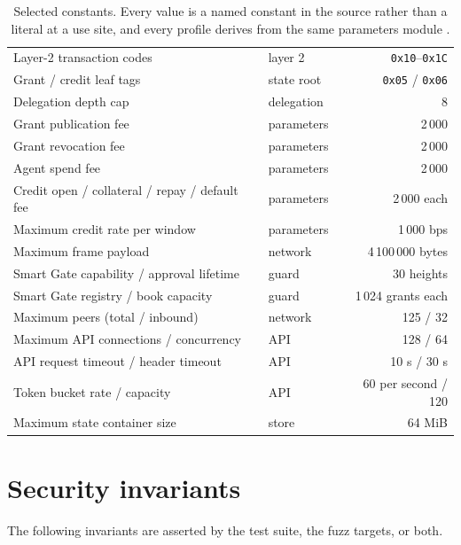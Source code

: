 \documentclass{article}
\begin{document}
\begin{table}[htbp]
\begin{tabular}{llr}
Layer-2 transaction codes & layer 2 & \texttt{0x10}--\texttt{0x1C} \\
Grant / credit leaf tags & state root & \texttt{0x05} / \texttt{0x06} \\
Delegation depth cap & delegation & 8 \\
Grant publication fee & parameters & 2\,000 \\
Grant revocation fee & parameters & 2\,000 \\
Agent spend fee & parameters & 2\,000 \\
Credit open / collateral / repay / default fee & parameters & 2\,000 each \\
Maximum credit rate per window & parameters & 1\,000 bps \\
Maximum frame payload & network & 4\,100\,000 bytes \\
Smart Gate capability / approval lifetime & guard & 30 heights \\
Smart Gate registry / book capacity & guard & 1\,024 grants each \\
Maximum peers (total / inbound) & network & 125 / 32 \\
Maximum API connections / concurrency & API & 128 / 64 \\
API request timeout / header timeout & API & 10 s / 30 s \\
Token bucket rate / capacity & API & 60 per second / 120 \\
Maximum state container size & store & 64 MiB \\
\bottomrule
\end{tabular}
\caption{Selected constants. Every value is a named constant in the source
rather than a literal at a use site, and every profile derives from the same
parameters module \cite{srct-spec}.}
\label{tab:constants}
\end{table}

\section{Security invariants}
\label{app:invariants}

The following invariants are asserted by the test suite, the fuzz targets, or
both.
\end{document}
